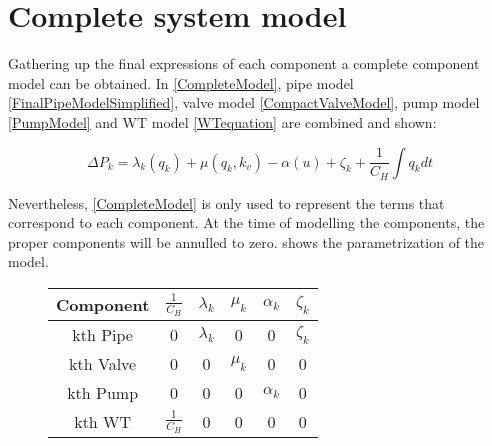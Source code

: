 \section{Complete system model} 
\label{CompleteSystemModel}

Gathering up the final expressions of each component a complete component model can be obtained. In \eqref{CompleteModel}, pipe model \eqref{FinalPipeModelSimplified}, valve model 
\eqref{CompactValveModel}, pump model \eqref{PumpModel} and WT model \eqref{WTequation} are combined and shown:

\begin{equation}
  \label{CompleteModel}
  \Delta P_k = \lambda_k (q_k) + \mu (q_k, k_v) - \alpha (u) + \zeta_k + \frac{1}{C_H}  \int   q_k dt 
\end{equation}

Nevertheless, \eqref{CompleteModel} is only used to represent the terms that correspond to each component. At the time of modelling the 
components, the proper components will be annulled to zero.  shows the 
parametrization of the model.

\begin{figure}[H]
	\centering
\begin{tabular}{c|ccccc} 
  			\bfseries Component    &   $\frac{1}{C_H}$    &     $\lambda_k$    &     $\mu_k$    &     $\alpha_k$    &     $\zeta_k$  					\\ 
  			\hline
			kth Pipe		  	      &      0                    &         $\lambda_k$                            &    0                             &            0                       &      $\zeta_k$   		                         \\ 
			kth Valve           	      &      0                    &         0                            &    $\mu_k$                             &            0                       &      0    					 \\ 
			kth Pump 		      &      0                    &         0                            &    0                             &            $\alpha_k$                       &      0    				         \\ 
			kth WT                           &      $\frac{1}{C_H}$                   &         0                            &    0                             &            0                       &      0     
\end{tabular}
		\label{tab:parametrization_model}

\end{figure}	

